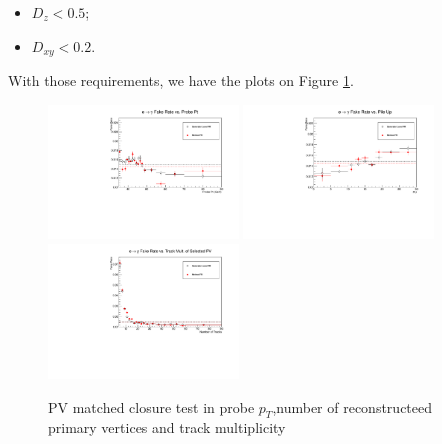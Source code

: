 \begin{itemize}
\item $D_z < 0.5$;
\item $D_{xy} < 0.2$.
\end{itemize}

With those requirements, we have the plots on Figure \ref{closure_all}.

\begin{figure}[H]
\begin{center}
{\label{closure_pt}\includegraphics[width=0.45\textwidth]{efake_figs/closure_pt.pdf}}
{\label{closure_pu}\includegraphics[width=0.45\textwidth]{efake_figs/closure_pu.pdf}}
\\
{\label{closure_ntrk}\includegraphics[width=0.45\textwidth]{efake_figs/closure_trk.pdf}}
\caption{PV matched closure test in probe $p_T$,number of reconstructeed primary vertices and track multiplicity}
\label{closure_all}
\end{center}
\end{figure}



